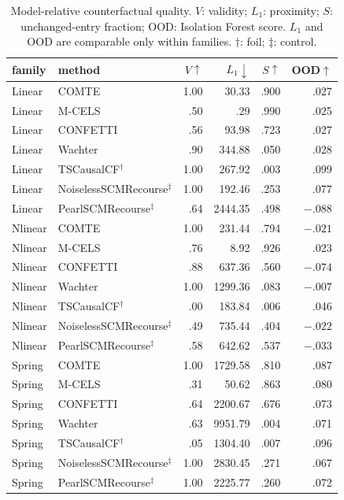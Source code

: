 \documentclass{article}
\begin{document}
\begin{table}[t]
  \centering
  \scriptsize
  \caption{Model-relative counterfactual quality.  $V$: validity; $L_1$: proximity; $S$: unchanged-entry fraction; OOD: Isolation Forest score.  $L_1$ and OOD are comparable only within families.  $\dagger$: foil; $\ddagger$: control.}
  \label{tab:conventional-results}
  \setlength{\tabcolsep}{3.2pt}
  \begin{tabular}{@{}llrrrr@{}}
    \toprule
    family & method & $V\uparrow$ & $L_1\downarrow$ & $S\uparrow$ & OOD$\uparrow$ \\
    \midrule
    Linear & COMTE    & 1.00 & 30.33  & .900 & .027 \\
    Linear & M-CELS   & .50  & .29    & .990 & .025 \\
    Linear & CONFETTI & .56  & 93.98  & .723 & .027 \\
    Linear & Wachter  & .90  & 344.88 & .050 & .028 \\
    Linear & TSCausalCF$^{\dagger}$ & 1.00 & 267.92 & .003 & .099 \\
    Linear & NoiselessSCMRecourse$^{\ddagger}$ & 1.00 & 192.46 & .253 & .077 \\
    Linear & PearlSCMRecourse$^{\ddagger}$ & .64 & 2444.35 & .498 & $-.088$ \\
    \midrule
    Nlinear & COMTE    & 1.00 & 231.44  & .794 & $-.021$ \\
    Nlinear & M-CELS   & .76  & 8.92    & .926 & .023 \\
    Nlinear & CONFETTI & .88  & 637.36  & .560 & $-.074$ \\
    Nlinear & Wachter  & 1.00 & 1299.36 & .083 & $-.007$ \\
    Nlinear & TSCausalCF$^{\dagger}$ & .00 & 183.84 & .006 & .046 \\
    Nlinear & NoiselessSCMRecourse$^{\ddagger}$ & .49 & 735.44 & .404 & $-.022$ \\
    Nlinear & PearlSCMRecourse$^{\ddagger}$ & .58 & 642.62 & .537 & $-.033$ \\
    \midrule
    Spring & COMTE    & 1.00 & 1729.58 & .810 & .087 \\
    Spring & M-CELS   & .31  & 50.62   & .863 & .080 \\
    Spring & CONFETTI & .64  & 2200.67 & .676 & .073 \\
    Spring & Wachter  & .63  & 9951.79 & .004 & .071 \\
    Spring & TSCausalCF$^{\dagger}$ & .05 & 1304.40 & .007 & .096 \\
    Spring & NoiselessSCMRecourse$^{\ddagger}$ & 1.00 & 2830.45 & .271 & .067 \\
    Spring & PearlSCMRecourse$^{\ddagger}$ & 1.00 & 2225.77 & .260 & .072 \\
    \bottomrule
  \end{tabular}
\end{table}
\end{document}
